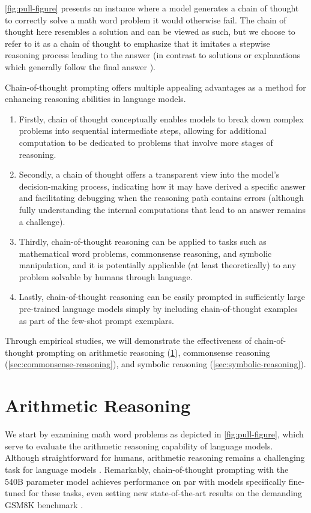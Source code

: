 \cref{fig:pull-figure} presents an instance where a model generates a chain of thought to correctly solve a math word problem it would otherwise fail. The chain of thought here resembles a solution and can be viewed as such, but we choose to refer to it as a chain of thought to emphasize that it imitates a stepwise reasoning process leading to the answer (in contrast to solutions or explanations which generally follow the final answer \citep[][\textit{inter alia}]{narang2020wt5,wiegreffe2021reframing,lampinen2022can}).

Chain-of-thought prompting offers multiple appealing advantages as a method for enhancing reasoning abilities in language models.

\begin{enumerate}[topsep=1pt,itemsep=0ex]
    \item Firstly, chain of thought conceptually enables models to break down complex problems into sequential intermediate steps, allowing for additional computation to be dedicated to problems that involve more stages of reasoning.
    \item Secondly, a chain of thought offers a transparent view into the model’s decision-making process, indicating how it may have derived a specific answer and facilitating debugging when the reasoning path contains errors (although fully understanding the internal computations that lead to an answer remains a challenge).
    \item Thirdly, chain-of-thought reasoning can be applied to tasks such as mathematical word problems, commonsense reasoning, and symbolic manipulation, and it is potentially applicable (at least theoretically) to any problem solvable by humans through language.
    \item Lastly, chain-of-thought reasoning can be easily prompted in sufficiently large pre-trained language models simply by including chain-of-thought examples as part of the few-shot prompt exemplars.
\end{enumerate}

Through empirical studies, we will demonstrate the effectiveness of chain-of-thought prompting on arithmetic reasoning (\cref{sec:arithmetic-reasoning}), commonsense reasoning (\cref{sec:commonsense-reasoning}), and symbolic reasoning (\cref{sec:symbolic-reasoning}).

\section{Arithmetic Reasoning}\label{sec:arithmetic-reasoning}
We start by examining math word problems as depicted in \cref{fig:pull-figure}, which serve to evaluate the arithmetic reasoning capability of language models. Although straightforward for humans, arithmetic reasoning remains a challenging task for language models \citep[][\textit{inter alia}]{hendrycks2021measuring,patel-etal-2021-nlp}. Remarkably, chain-of-thought prompting with the 540B parameter model achieves performance on par with models specifically fine-tuned for these tasks, even setting new state-of-the-art results on the demanding GSM8K benchmark \citep{cobbe2021training}.

